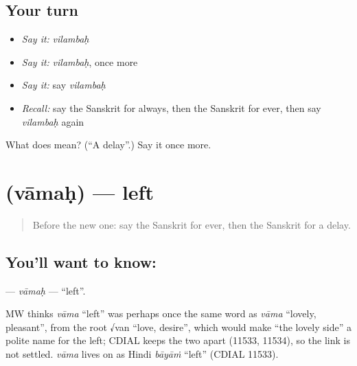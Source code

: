 \subsection*{Your turn}
\begin{itemize}
\raggedright
  \item \emph{Say it:} \emph{vilambaḥ}
  \item \emph{Say it:} \emph{vilambaḥ}, once more
  \item \emph{Say it:} say \emph{vilambaḥ}
  \item \emph{Recall:} say the Sanskrit for always, then the Sanskrit for ever, then say \emph{vilambaḥ} again
\end{itemize}

\begin{tcolorbox}[breakable,colback=teal!4,colframe=teal!35!black,title={Before you move on}]
What does  mean? (\textquotedblleft{}A delay\textquotedblright{}.) Say it once more.
\end{tcolorbox}
\section[\texorpdfstring{\sk{वामः} (vāmaḥ)}{वामः (vāmaḥ)}]{ (vāmaḥ) — left}

\label{lesson:SA-C93-vamah}



\begin{quote}
Before the new one: say the Sanskrit for ever, then the Sanskrit for a delay.
\end{quote}

\subsection*{You'll want to know: }
\textbf{} — \emph{vāmaḥ} — \textquotedblleft{}left\textquotedblright{}.

\begin{cousinweb}
MW thinks \emph{vāma} \textquotedblleft{}left\textquotedblright{} was perhaps once the same word as \emph{vāma} \textquotedblleft{}lovely, pleasant\textquotedblright{}, from the root √van \textquotedblleft{}love, desire\textquotedblright{}, which would make \textquotedblleft{}the lovely side\textquotedblright{} a polite name for the left; CDIAL keeps the two apart (11533, 11534), so the link is not settled. \emph{vāma} lives on as Hindi \emph{bāyāṁ} \textquotedblleft{}left\textquotedblright{} (CDIAL 11533).
\end{cousinweb}

